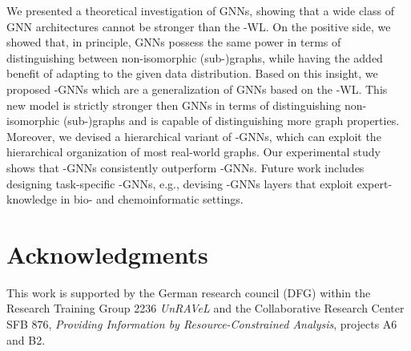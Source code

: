 \documentclass[letterpaper]{article}
\theoremstyle{definition}
\begin{document}
We presented a theoretical investigation of GNNs, showing that a wide class of GNN architectures cannot be stronger than the -WL. On the positive side, we showed that, in principle, GNNs possess the same power in terms of distinguishing between non-isomorphic (sub-)graphs, while having the added benefit of adapting to the given data distribution. Based on this insight, we proposed -GNNs which are a generalization of GNNs based on the -WL. This new model is strictly stronger then GNNs in terms of distinguishing non-isomorphic (sub-)graphs and is capable of distinguishing more graph properties. Moreover, we devised a hierarchical variant of -GNNs, which can exploit the hierarchical organization of most real-world graphs. Our experimental study shows that -GNNs consistently outperform -GNNs. Future work includes designing task-specific -GNNs, e.g., devising -GNNs layers that exploit expert-knowledge in bio- and chemoinformatic settings. 

\section*{Acknowledgments}
This work is supported by the German research council (DFG) within the Research Training Group 2236 \emph{UnRAVeL} and the Collaborative Research Center
SFB 876, \emph{Providing Information by Resource-Constrained
	Analysis}, projects A6 and B2.
\end{document}
